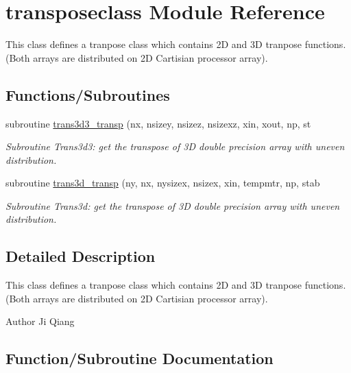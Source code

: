 \hypertarget{namespacetransposeclass}{}\section{transposeclass Module Reference}
\label{namespacetransposeclass}


This class defines a tranpose class which contains 2D and 3D tranpose functions. (Both arrays are distributed on 2D Cartisian processor array).  


\subsection*{Functions/\+Subroutines}
\begin{DoxyCompactItemize}
\item 
subroutine \mbox{\hyperlink{namespacetransposeclass_ac2cdff8d4fbeb19df8a8ba2ff562b8c2}{trans3d3\+\_\+transp}} (nx, nsizey, nsizez, nsizexz, xin, xout, np, st
\begin{DoxyCompactList}\small\item\em Subroutine Trans3d3\+: get the transpose of 3D double precision array with uneven distribution. \end{DoxyCompactList}\item 
subroutine \mbox{\hyperlink{namespacetransposeclass_a53eeae5e11acd8c39e03fb8672f2d90e}{trans3d\+\_\+transp}} (ny, nx, nysizex, nsizex, xin, tempmtr, np, stab
\begin{DoxyCompactList}\small\item\em Subroutine Trans3d\+: get the transpose of 3D double precision array with uneven distribution. \end{DoxyCompactList}\end{DoxyCompactItemize}


\subsection{Detailed Description}
This class defines a tranpose class which contains 2D and 3D tranpose functions. (Both arrays are distributed on 2D Cartisian processor array). 

\begin{DoxyAuthor}{Author}
Ji Qiang 
\end{DoxyAuthor}


\subsection{Function/\+Subroutine Documentation}
\mbox{\label{namespacetransposeclass_ac2cdff8d4fbeb19df8a8ba2ff562b8c2}} 
